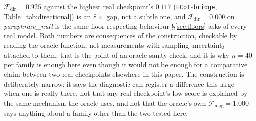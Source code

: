 $\mathcal{F}_{\text{dir}} = 0.925$ against the highest real checkpoint's $0.117$ (\texttt{ECoT-bridge}, Table~\ref{tab:directional}) is an $8\times$ gap, not a subtle one, and $\mathcal{F}_{\text{dir}}=0.000$ on \emph{paraphrase\_null} is the same floor-respecting behaviour \S\ref{sec:floors} asks of every real model. Both numbers are consequences of the construction, checkable by reading the oracle function, not measurements with sampling uncertainty attached to them; that is the point of an oracle sanity check, and it is why $n{=}40$ per family is enough here even though it would not be enough for a comparative claim between two real checkpoints elsewhere in this paper. The construction is deliberately narrow: it says the diagnostic can register a difference this large when one is really there, not that any real checkpoint's low score is explained by the same mechanism the oracle uses, and not that the oracle's own $\mathcal{F}_{\text{mag}}=1.000$ says anything about a family other than the two tested here.

